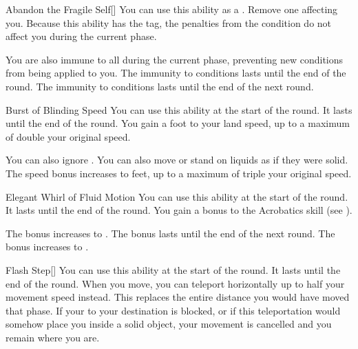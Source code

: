         {
            \begin{apability}{Abandon the Fragile Self}[]
                You can use this ability as a .
                Remove one  affecting you.
                Because this ability has the  tag, the penalties from the condition do not affect you during the current phase.

                \rankline
                 You are also immune to all  during the current phase, preventing new conditions from being applied to you.
                 The immunity to conditions lasts until the end of the round.
                 The immunity to conditions lasts until the end of the next round.
            \end{apability}

            \begin{apability}{Burst of Blinding Speed}
                You can use this ability at the start of the round.
                It lasts until the end of the round.
                You gain a  foot  to your land speed, up to a maximum of double your original speed.

                \rankline
                 You can also ignore .
                 You can also move or stand on liquids as if they were solid.
                 The speed bonus increases to  feet, up to a maximum of triple your original speed.
            \end{apability}

            \begin{apability}{Elegant Whirl of Fluid Motion}
                You can use this ability at the start of the round.
                It lasts until the end of the round.
                You gain a  bonus to the Acrobatics skill (see ).

                \rankline
                 The bonus increases to .
                 The bonus lasts until the end of the next round.
                 The bonus increases to .
            \end{apability}

            \begin{apability}{Flash Step}[]
                You can use this ability at the start of the round.
                It lasts until the end of the round.
                When you move, you can teleport horizontally up to half your movement speed instead.
                This replaces the entire distance you would have moved that phase.
                If your  to your destination is blocked, or if this teleportation would somehow place you inside a solid object, your movement is cancelled and you remain where you are.


\end{apability}}
